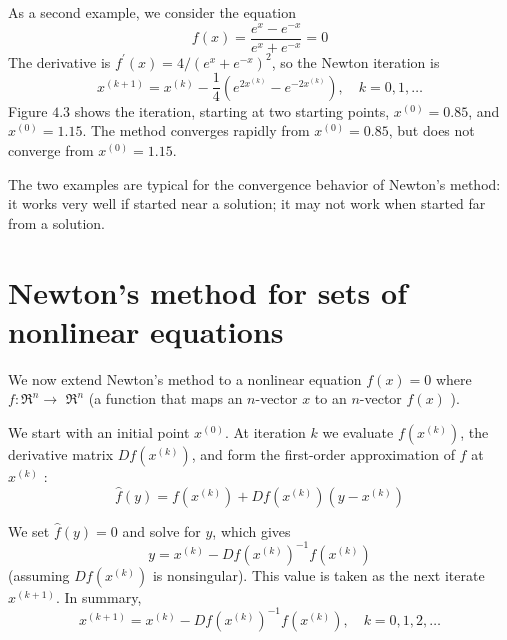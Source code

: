 \begin{example}
    As a second example, we consider the equation
\begin{equation}
f(x)=\frac{e^{x}-e^{-x}}{e^{x}+e^{-x}}=0
\end{equation}
The derivative is $ f^{\prime}(x)=4 /\left(e^{x}+e^{-x}\right)^{2} $, so the Newton iteration is
\begin{equation}
x^{(k+1)}=x^{(k)}-\frac{1}{4}\left(e^{2 x^{(k)}}-e^{-2 x^{(k)}}\right), \quad k=0,1, \ldots
\end{equation}
Figure $ 4.3 $ shows the iteration, starting at two starting points, $ x^{(0)}=0.85 $, and $ x^{(0)}=1.15 $. The method converges rapidly from $ x^{(0)}=0.85 $, but does not converge from $ x^{(0)}=1.15 $.

The two examples are typical for the convergence behavior of Newton's method: it works very well if started near a solution; it may not work when started far from a solution.
\end{example}

\section{Newton's method for sets of nonlinear equations}

We now extend Newton's method to a nonlinear equation $ f(x)=0 $ where $ f: \mathfrak{R}^{n} \rightarrow $ $ \mathfrak{R}^{n} $ (a function that maps an $ n $-vector $ x $ to an $ n $-vector $ f(x) $ ).

We start with an initial point $ x^{(0)} $. At iteration $ k $ we evaluate $ f\left(x^{(k)}\right) $, the derivative matrix $ D f\left(x^{(k)}\right) $, and form the first-order approximation of $ f $ at $ x^{(k)} $ :
\begin{equation}
\hat{f}(y)=f\left(x^{(k)}\right)+D f\left(x^{(k)}\right)\left(y-x^{(k)}\right)
\end{equation}

We set $ \hat{f}(y)=0 $ and solve for $ y $, which gives
\begin{equation}
y=x^{(k)}-D f\left(x^{(k)}\right)^{-1} f\left(x^{(k)}\right)
\end{equation}
(assuming $ D f\left(x^{(k)}\right) $ is nonsingular). This value is taken as the next iterate $ x^{(k+1)} $. In summary,
\begin{equation}
x^{(k+1)}=x^{(k)}-D f\left(x^{(k)}\right)^{-1} f\left(x^{(k)}\right), \quad k=0,1,2, \ldots
\end{equation}

